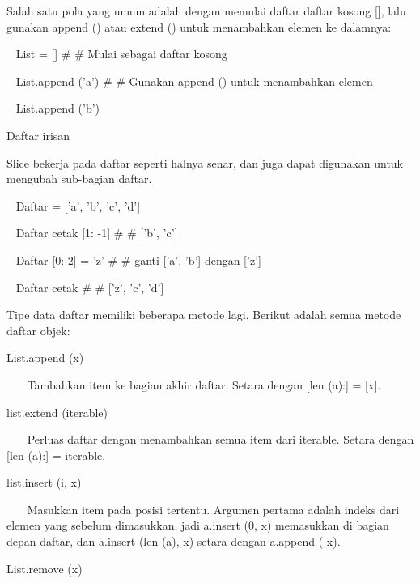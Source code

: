 Salah satu pola yang umum adalah dengan memulai daftar daftar kosong [], lalu gunakan append () atau extend () untuk menambahkan elemen ke dalamnya: \par
\vspace{12pt}
~ List = []  $  \#  $ $  \#  $ Mulai sebagai daftar kosong \par
~ List.append ('a')  $  \#  $ $  \#  $ Gunakan append () untuk menambahkan elemen \par
~ List.append ('b') \par
\vspace{12pt}
Daftar irisan \par
\vspace{12pt}
Slice bekerja pada daftar seperti halnya senar, dan juga dapat digunakan untuk mengubah sub-bagian daftar. \par
\vspace{12pt}
~ Daftar = ['a', 'b', 'c', 'd'] \par
~ Daftar cetak [1: -1]  $  \#  $ $  \#  $ ['b', 'c'] \par
~ Daftar [0: 2] = 'z'  $  \#  $ $  \#  $ ganti ['a', 'b'] dengan ['z'] \par
~ Daftar cetak  $  \#  $ $  \#  $ ['z', 'c', 'd'] \par
Tipe data daftar memiliki beberapa metode lagi. Berikut adalah semua metode daftar objek: \par
\vspace{12pt}
List.append (x) \par
\vspace{12pt}
~~~ Tambahkan item ke bagian akhir daftar. Setara dengan [len (a):] = [x]. \par
\vspace{12pt}
list.extend (iterable) \par
\vspace{12pt}
~~~ Perluas daftar dengan menambahkan semua item dari iterable. Setara dengan [len (a):] = iterable. \par
\vspace{12pt}
list.insert (i, x) \par
\vspace{12pt}
~~~ Masukkan item pada posisi tertentu. Argumen pertama adalah indeks dari elemen yang sebelum dimasukkan, jadi a.insert (0, x) memasukkan di bagian depan daftar, dan a.insert (len (a), x) setara dengan a.append ( x). \par
\vspace{12pt}
List.remove (x) \par
\vspace{12pt}
